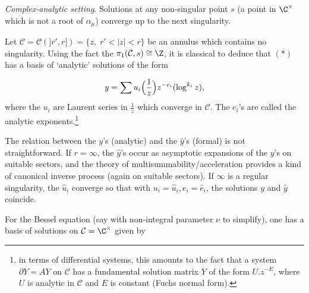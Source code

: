 \begin{para}\label{para::3.1.3} {\it Complex-analytic setting}.  Solutions at
 any non-singular point $s$ (\ie a point in $\C^\times$ which is not a
 root of $\alpha_\mu$) converge up to the next singularity.

 Let ${\mathcal{C}}= \mathcal{C}(]r',r[) =\{z, \;r'<|z| < r\}$ be an
 annulus which contains no singularity. Using the fact the
 $\pi_1(\mathcal{C},s)\cong \Z$, it is classical to deduce that $(\ast)$
 has a basis of `analytic' solutions of the form

 \begin{equation*}
  y=\sum {u_i}\Bigl(\frac{1}{z}\Bigr) z^{-{e}_i} (\log^{k_i} z),
 \end{equation*}
 where the ${u_i}$ are Laurent series in $\frac{1}{z}$
 which converge in $\mathcal{C}$.
 The ${ e}_i$'s are called the analytic exponents.\footnote{in terms of
 differential systems, this amounts to the fact that a system
 $\partial Y = A Y$ on $\mathcal{C}$ has a fundamental solution matrix
 $Y$ of the form 
 $U.z^{-E}$, where $U$ is analytic in $\mathcal{C}$ and $E$ is constant (Fuchs
 normal form).}

 \medskip
 The relation between the $y$'s (analytic) and
 the $\hat y$'s (formal) is not straightforward. If $r=\infty$, the $\hat
 y$'s occur as asymptotic expansions of the $y$'s on suitable sectors,
 and the theory of multisummability/acceleration provides a kind of
 canonical inverse process (again on suitable sectors). If $\infty$ is a
 regular singularity, the $\hat u_i$ converge so that with $u_i=\hat u_i,
 e_i=\hat e_i$, the solutions $y$ and $\hat y$ coincide.

 \medskip
  For the Bessel equation (say with non-integral
 parameter $\nu$ to simplify), one has a basis of solutions on
 $\mathcal{C}=\C^\times$ given by
  

\end{para}
